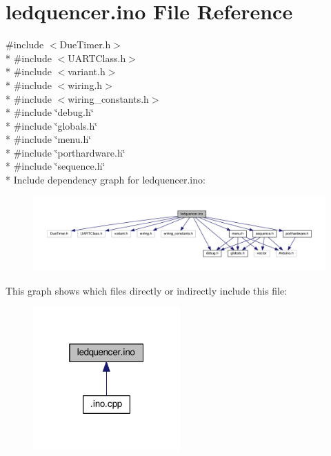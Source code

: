 \hypertarget{ledquencer_8ino}{\section{ledquencer.\-ino File Reference}
\label{ledquencer_8ino}
}
{\ttfamily \#include $<$Due\-Timer.\-h$>$}\\*
{\ttfamily \#include $<$U\-A\-R\-T\-Class.\-h$>$}\\*
{\ttfamily \#include $<$variant.\-h$>$}\\*
{\ttfamily \#include $<$wiring.\-h$>$}\\*
{\ttfamily \#include $<$wiring\-\_\-constants.\-h$>$}\\*
{\ttfamily \#include \char`\"{}debug.\-h\char`\"{}}\\*
{\ttfamily \#include \char`\"{}globals.\-h\char`\"{}}\\*
{\ttfamily \#include \char`\"{}menu.\-h\char`\"{}}\\*
{\ttfamily \#include \char`\"{}porthardware.\-h\char`\"{}}\\*
{\ttfamily \#include \char`\"{}sequence.\-h\char`\"{}}\\*
Include dependency graph for ledquencer.\-ino\-:
\nopagebreak
\begin{figure}[H]
\begin{center}
\leavevmode
\includegraphics[width=350pt]{ledquencer_8ino__incl}
\end{center}
\end{figure}
This graph shows which files directly or indirectly include this file\-:\nopagebreak
\begin{figure}[H]
\begin{center}
\leavevmode
\includegraphics[width=160pt]{ledquencer_8ino__dep__incl}
\end{center}
\end{figure}
